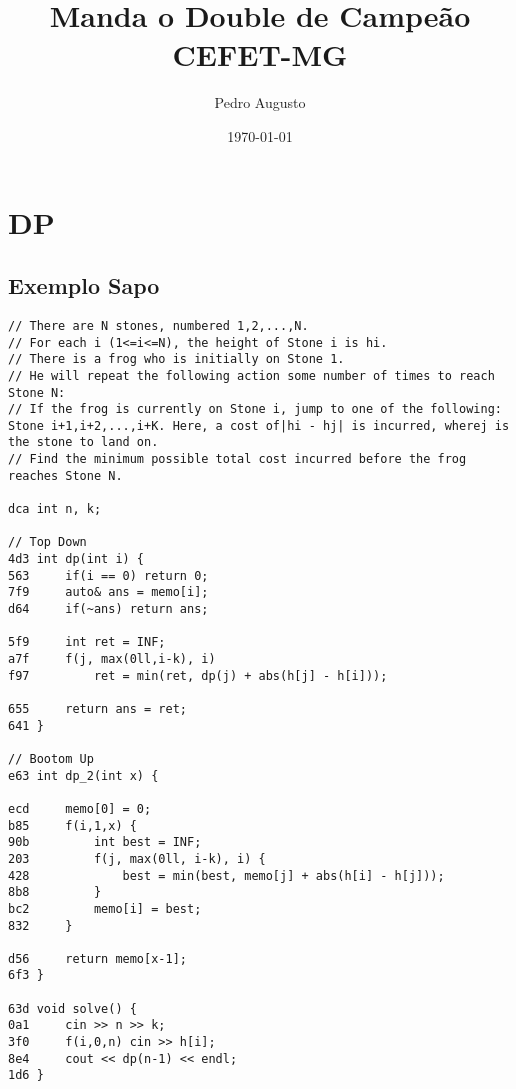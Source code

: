 \documentclass[11pt, a4paper, twoside]{article}
\title{Manda o Double de Campeão \\ CEFET-MG}
\author{Pedro Augusto}
\begin{document}
\twocolumn
\date{\today}
\maketitle


\renewcommand{\contentsname}{Índice} %
\tableofcontents


%
%

\section{DP}

\subsection{Exemplo Sapo}
\begin{lstlisting}
// There are N stones, numbered 1,2,...,N. 
// For each i (1<=i<=N), the height of Stone i is hi.
// There is a frog who is initially on Stone 1. 
// He will repeat the following action some number of times to reach Stone N:
// If the frog is currently on Stone i, jump to one of the following: Stone i+1,i+2,...,i+K. Here, a cost of|hi - hj| is incurred, wherej is the stone to land on.
// Find the minimum possible total cost incurred before the frog reaches Stone N.

dca int n, k;

// Top Down
4d3 int dp(int i) {
563 	if(i == 0) return 0;
7f9 	auto& ans = memo[i];
d64 	if(~ans) return ans;
    
5f9 	int ret = INF;
a7f 	f(j, max(0ll,i-k), i)
f97 		ret = min(ret, dp(j) + abs(h[j] - h[i]));
    
655 	return ans = ret;
641 }

// Bootom Up
e63 int dp_2(int x) {
    	
ecd 	memo[0] = 0;
b85 	f(i,1,x) {
90b 		int best = INF;
203 		f(j, max(0ll, i-k), i) {
428 			best = min(best, memo[j] + abs(h[i] - h[j]));
8b8 		}
bc2 		memo[i] = best;
832 	}
    
d56 	return memo[x-1];
6f3 }

63d void solve() {
0a1 	cin >> n >> k;
3f0 	f(i,0,n) cin >> h[i];
8e4 	cout << dp(n-1) << endl;
1d6 }
\end{lstlisting}
\end{document}
